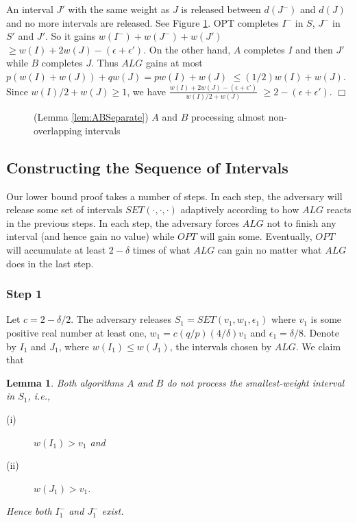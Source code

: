 \documentclass[11pt]{article}
\newtheorem{lemma}{Lemma}[section]
\newcommand{\qed}{\hspace*{\fill}$\Box$\par\medskip}
\newenvironment{proof}{\noindent{\it Proof. }\ignorespaces}{\qed}
\begin{document}
\begin{proof}
An interval $J'$ with the same weight as $J$ is
released between $d(J^-)$ and $d(J)$
and no more intervals are released.
See Figure \ref{fig:abseparate}.
OPT completes $I^-$ in $S$, $J^-$ in $S'$ and $J'$.
So it gains $w(I^-) + w(J^-) + w(J')$
$\geq w(I) + 2w(J) - (\epsilon+\epsilon')$.
On the other hand, $A$ completes $I$ and then $J'$
while $B$ completes $J$.
Thus $ALG$ gains at most $p(w(I)+w(J)) + qw(J) = pw(I) + w(J)$
$\leq (1/2)w(I) +w(J)$.
Since $w(I)/2 + w(J) \geq 1$, we have
$\frac{w(I)+2w(J)-(\epsilon+\epsilon')}{w(I)/2+w(J)}$
$\geq 2-(\epsilon+\epsilon')$.
\end{proof}

\begin{figure}
\centerline{ \epsfysize=0.9in  }
\caption{(Lemma \ref{lem:ABSeparate}) $A$ and $B$ processing
almost non-overlapping intervals}
\label{fig:abseparate}
\end{figure}

\subsection{Constructing the Sequence of Intervals}

Our lower bound proof takes a number of steps.
In each step, the adversary will release some set of intervals
$SET(\cdot,\cdot,\cdot)$ adaptively according to how $ALG$ reacts
in the previous steps.
In each step, the adversary forces $ALG$ not to finish any interval 
(and hence gain no value) while $OPT$ will gain some.
Eventually, $OPT$ will accumulate at least $2-\delta$ times of
what $ALG$ can gain no matter what $ALG$ does in the last step.

\subsubsection{Step 1}
  \label{subsec:step1}

Let $c = 2 - \delta/2$.
The adversary releases $S_1 = SET(v_1,w_1,\epsilon_1)$
where $v_1$ is some positive real number at least one,
$w_1 = c(q/p)(4/\delta) v_1$ and $\epsilon_1 = \delta/8$.
Denote by $I_1$ and $J_1$, where $w(I_1) \leq w(J_1)$,
the intervals chosen by $ALG$.
We claim that

\begin{lemma} \label{lem:x1>v1}
Both algorithms $A$ and $B$ do not process the smallest-weight
interval in $S_1$, i.e.,
\begin{description}
\item[{\rm (i)}]
$w(I_1) > v_1$ and
\item[{\rm (ii)}]
$w(J_1) > v_1$.
\end{description}
Hence both $I_1^-$ and $J_1^-$ exist.
\end{lemma}
\end{document}
